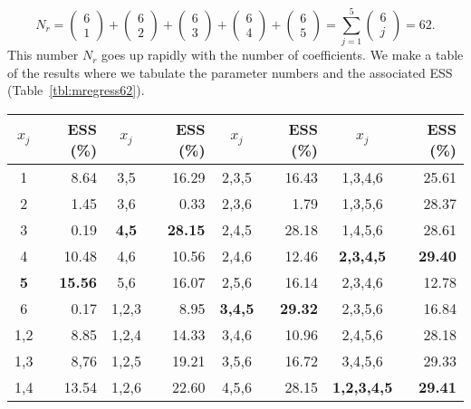 \begin{example}
\begin{equation}
N_r = \left ( \begin{array}{c}
6 \\ 1 \end{array} \right ) + \left ( \begin{array}{c}
6 \\ 2 \end{array} \right ) + \left ( \begin{array}{c}
6 \\ 3 \end{array} \right ) + 
\left ( \begin{array}{c}
6 \\ 4 \end{array} \right ) + 
\left ( \begin{array}{c}
6 \\ 5 \end{array} \right )  = \sum ^5 _{j=1} 
\left ( \begin{array}{c}
6 \\ j \end{array} \right ) = 62.
\end{equation}	 
This number $N_r$ goes up rapidly with the number of coefficients.  We make a table of the 
results where we tabulate the parameter numbers and the associated ESS (Table~\ref{tbl:mregress62}).
\begin{table}[H]
\center
\begin{tabular}{|cr|cr|cr|cr|} \hline
$x_j$	& 	\bf{ESS} (\%) &	$x_j$	& 	\bf{ESS} (\%) &	$x_j$	& 	\bf{ESS} (\%) &	$x_j$		& 	\bf{ESS} (\%) \\ \hline
1	&	8.64	&	3,5	&	16.29	&	2,3,5	&	16.43	&	1,3,4,6		&	25.61 \\ \hline
2	&	1.45	&	3,6	&	0.33	&	2,3,6	&	1.79	&	1,3,5,6		&	28.37 \\ \hline
3	&	0.19	&	\bf{4,5}	&	\bf{28.15}	&	2,4,5	&	28.18	&	1,4,5,6		&	28.61 \\ \hline
4	&	10.48	&	4,6	&	10.56	&	2,4,6	&	12.46	&	\bf{2,3,4,5}		&	\bf{29.40} \\ \hline
\bf{5}	&	\bf{15.56}	&	5,6	&	16.07	&	2,5,6	&	16.14	&	2,3,4,6		&	12.78 \\ \hline
6	&	0.17	&	1,2,3	&	8.95	&	\bf{3,4,5}	&	\bf{29.32}	&	2,3,5,6		&	16.84 \\ \hline
1,2	&	8.85	&	1,2,4	&	14.33	&	3,4,6	&	10.96	&	2,4,5,6		&	28.18 \\ \hline
1,3	&	8,76	&	1,2,5	&	19.21	&	3,5,6	&	16.72	&	3,4,5,6		&	29.33 \\ \hline
1,4	&	13.54	&	1,2,6	&	22.60	&	4,5,6	&	28.15	&	\bf{1,2,3,4,5}	&	\bf{29.41} \\ \hline

\end{tabular}
\end{table}
\end{example}
